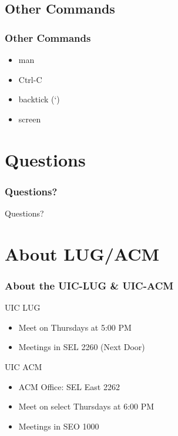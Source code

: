 \documentclass[hyperref={pdfpagelabels=false}]{beamer}
\begin{document}
\subsection{Other Commands}
\frame
{
    \frametitle{Other Commands}
    \begin{itemize}
    \item{man}
    \item{Ctrl-C}
    \item{backtick (`)}
    \item{screen}
    \end{itemize}
}
\section{Questions}
\frame
{	
    \frametitle{Questions?}
    Questions?
}
\section{About LUG/ACM}
\frame
{	
    \frametitle{About the UIC-LUG & UIC-ACM}
    UIC LUG
    \begin{itemize}
    \item{Meet on Thursdays at 5:00 PM}
    \item{Meetings in SEL 2260 (Next Door)}
    \end{itemize}
    UIC ACM
    \begin{itemize}
    \item{ACM Office: SEL East 2262}
    \item{Meet on select Thursdays at 6:00 PM}
    \item{Meetings in SEO 1000}
    \end{itemize}
}
\end{document}
